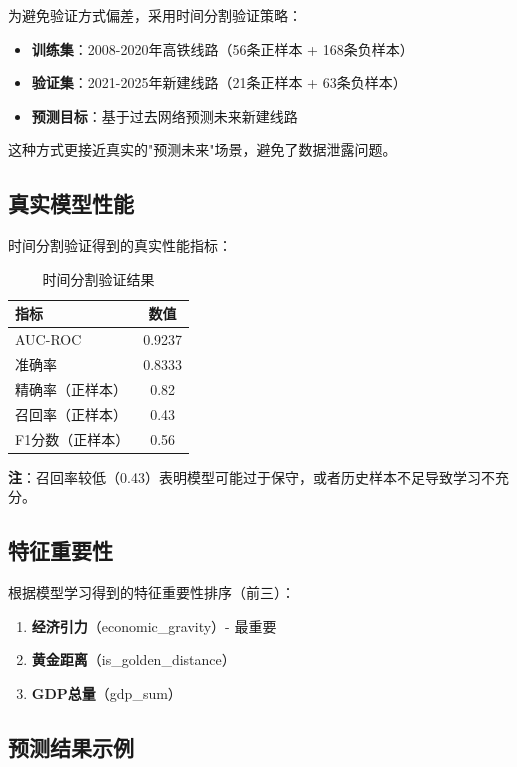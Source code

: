 \documentclass[12pt,a4paper]{article}
\begin{document}
为避免验证方式偏差，采用时间分割验证策略：

\begin{itemize}
    \item \textbf{训练集}：2008-2020年高铁线路（56条正样本 + 168条负样本）
    \item \textbf{验证集}：2021-2025年新建线路（21条正样本 + 63条负样本）
    \item \textbf{预测目标}：基于过去网络预测未来新建线路
\end{itemize}

这种方式更接近真实的"预测未来"场景，避免了数据泄露问题。

\subsection{真实模型性能}

时间分割验证得到的真实性能指标：

\begin{table}[h]
\centering
\caption{时间分割验证结果}
\begin{tabular}{lc}
\toprule
指标 & 数值 \\
\midrule
AUC-ROC & 0.9237 \\
准确率 & 0.8333 \\
精确率（正样本） & 0.82 \\
召回率（正样本） & 0.43 \\
F1分数（正样本） & 0.56 \\
\bottomrule
\end{tabular}
\end{table}

\textbf{注}：召回率较低（0.43）表明模型可能过于保守，或者历史样本不足导致学习不充分。

\subsection{特征重要性}

根据模型学习得到的特征重要性排序（前三）：

\begin{enumerate}
    \item \textbf{经济引力}（economic\_gravity）- 最重要
    \item \textbf{黄金距离}（is\_golden\_distance）
    \item \textbf{GDP总量}（gdp\_sum）
\end{enumerate}

\subsection{预测结果示例}
\end{document}
